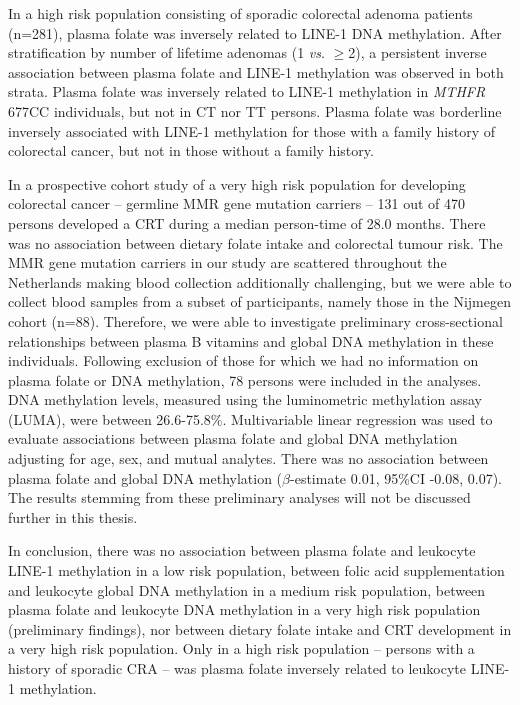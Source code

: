 \noindent In a high risk population consisting of sporadic colorectal adenoma patients (n=281), plasma folate was inversely related to LINE-1 DNA methylation. After stratification by number of lifetime adenomas (1 \emph{vs}. $\geq$2), a persistent inverse association between plasma folate and LINE-1 methylation was observed in both strata. Plasma folate was inversely related to LINE-1 methylation in \emph{MTHFR} 677CC individuals, but not in CT nor TT persons. Plasma folate was borderline inversely associated with LINE-1 methylation for those with a family history of colorectal cancer, but not in those without a family history. 
 
\noindent In a prospective cohort study of a very high risk population for developing colorectal cancer -- germline MMR gene mutation carriers -- 131 out of 470 persons developed a CRT during a median person-time of 28.0 months. There was no association between dietary folate intake and colorectal tumour risk. The MMR gene mutation carriers in our study are scattered throughout the Netherlands making blood collection additionally challenging, but we were able to collect blood samples from a subset of participants, namely those in the Nijmegen cohort (n=88). Therefore, we were able to investigate preliminary cross-sectional relationships between plasma B vitamins and global DNA methylation in these individuals. Following exclusion of those for which we had no information on plasma folate or DNA methylation, 78 persons were included in the analyses. DNA methylation levels, measured using the luminometric methylation assay (LUMA), were between 26.6-75.8\%. Multivariable linear regression was used to evaluate 
associations between plasma folate and global DNA methylation adjusting for age, sex, and mutual analytes. There was no association between plasma folate and global DNA methylation ($\beta$-estimate 0.01, 95\%CI -0.08, 0.07). The results stemming from these preliminary analyses will not be discussed further in this thesis. 
 
\noindent In conclusion, there was no association between plasma folate and leukocyte LINE-1 methylation in a low risk population, between folic acid supplementation and leukocyte global DNA methylation in a medium risk population, between plasma folate and leukocyte DNA methylation in a very high risk population (preliminary findings), nor between dietary folate intake and CRT development in a very high risk population. Only in a high risk population -- persons with a history of sporadic CRA -- was plasma folate inversely related to leukocyte LINE-1 methylation. 
 
